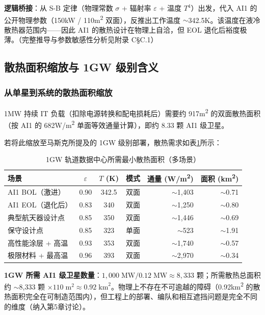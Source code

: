 \textbf{逻辑桥接}：从 S-B 定律（物理常数 $\sigma$ + 辐射率 $\varepsilon$ + 温度 $T^4$）出发，代入 AI1 的公开物理参数（150\;kW / 110\;m\textsuperscript{2} 双面），反推出工作温度 $\sim$342.5\;K。该温度在液冷散热器范围内——因此 AI1 的散热设计在物理上自洽，但 EOL 退化后裕度极薄。（完整推导与参数敏感性分析见附录 C\;\S C.1）

\subsection{散热面积缩放与 1\;GW 级别含义}

\subsubsection{从单星到系统的散热面积缩放}

1\;MW 持续 IT 负载（扣除电源转换和配电损耗后）需要约 917\;m\textsuperscript{2} 的双面散热面积（按 AI1 的 682\;W/m\textsuperscript{2} 单面等效通量计算），即约 8.33 颗 AI1 级卫星。

若将此缩放至马斯克所提及的 1\;GW 级别部署，散热需求如表\ref{tab:gigawatt_area}所示：

\begin{table}[H]
\centering
\caption{1\;GW 轨道数据中心所需最小散热面积（多场景）}
\label{tab:gigawatt_area}
\footnotesize
\begin{tabular}{lcccrr}
\toprule
\textbf{场景} & $\varepsilon$ & $T$ (K) & \textbf{模式} & \textbf{通量 (W/m\textsuperscript{2})} & \textbf{面积 (km\textsuperscript{2})} \\
\midrule
AI1 BOL（激进）      & 0.90 & 342.5 & 双面 & $\sim$1,403 & $\sim$0.71 \\
AI1 EOL（退化后）     & 0.83 & 340   & 双面 & $\sim$1,250 & $\sim$0.80 \\
典型航天器设计点      & 0.85 & 350   & 双面 & $\sim$1,446 & $\sim$0.69 \\
保守设计点            & 0.85 & 323   & 单面 & $\sim$523   & $\sim$1.91 \\
高性能涂层 + 高温    & 0.93 & 353   & 双面 & $\sim$1,740 & $\sim$0.57 \\
极限材料 + 最高温    & 0.96 & 393   & 双面 & $\sim$2,970 & $\sim$0.34 \\
\bottomrule
\end{tabular}
\end{table}

\textbf{1\;GW 所需 AI1 级卫星数量}：$1,000\;\text{MW} / 0.12\;\text{MW} \approx 8,333$ 颗；所需散热总面积约 $\sim$8,333 颗 $\times 110\;\text{m}^2 \approx 0.92\;\text{km}^2$。物理上不存在不可逾越的障碍（0.92\;km\textsuperscript{2} 的散热面积完全在可制造范围内），但工程上的部署、编队和相互遮挡问题是完全不同的维度（纳入第5章讨论）。

